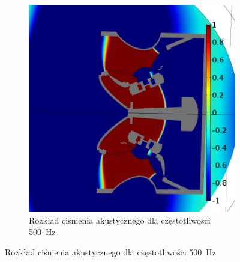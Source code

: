 \documentclass[12pt]{oska}
\begin{document}
\begin{figure}[!ht]
\begin{subfigure}[b]{.49\textwidth}
				\includegraphics[width=\textwidth]{pres_sig_500Hz.png}
				\caption{Rozkład ciśnienia akustycznego dla częstotliwości \SI{500}{\hertz}}
				\label{r:C_500}
			\end{subfigure}
			

\end{figure}
\end{document}
